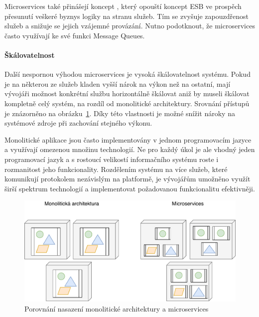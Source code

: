 Microservices také přinášejí koncept ,
který opouští koncept ESB ve prospěch přesunutí veškeré byznys logiky
na stranu služeb. Tím se zvyšuje zapouzdřenost služeb a snižuje se
jejich vzájemné provázání. Nutno podotknout, že microservices často
využívají ke své funkci Message Queues.

\paragraph{Škálovatelnost}
Další nespornou výhodou microservices je vysoká škálovatelnost systému. Pokud je na
některou ze služeb kladen vyšší nárok na výkon než na ostatní, mají
vývojáři možnost konkrétní službu horizontálně škálovat aniž by
museli škálovat kompletně celý systém, na rozdíl od monolitické architektury.
Srovnání přístupů je znázorněno na obrázku~\ref{fig:microservices-deployment}.
Díky této vlastnosti je možné snížit nároky na systémové zdroje při zachování
stejného výkonu.

Monolitické aplikace jsou často implementovány v jednom programovacím jazyce
a využívají omezenou množinu technologií. Ne pro každý úkol je ale vhodný
jeden programovací jazyk a s rostoucí velikostí informačního systému roste
i rozmanitost jeho funkcionality. Rozdělením systému na více služeb, které
komunikují protokolem nezávislým na platformě, je vývojářům umožněno využít
širší spektrum technologií a implementovat požadovanou funkcionalitu
efektivněji.

\begin{figure}
    \centering
    \includegraphics[keepaspectratio=true, width=0.8\linewidth]{figures/microservices-deployment.pdf}
    \caption{Porovnání nasazení monolitické architektury a microservices}
    \label{fig:microservices-deployment}
\end{figure}

